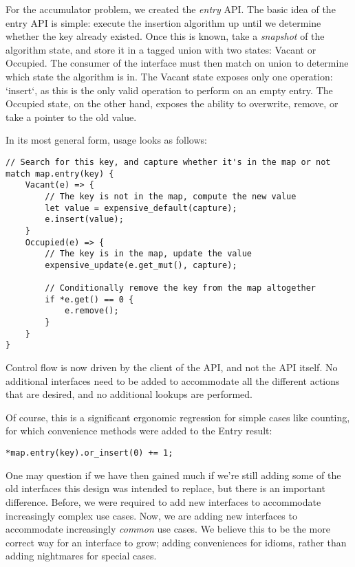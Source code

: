 For the accumulator problem, we created the \emph{entry} API. The basic idea of the
entry API is simple: execute the insertion algorithm up until we determine
whether the key already existed. Once this is known, take a \emph{snapshot} of
the algorithm state, and store it in a tagged union with two states: Vacant or
Occupied. The consumer of the interface must then match on union to determine
which state the algorithm is in. The Vacant state exposes only one operation:
`insert`, as this is the only valid operation to perform on an empty entry.
The Occupied state, on the other hand, exposes the ability to overwrite, remove,
or take a pointer to the old value.

In its most general form, usage looks as follows:

\begin{verbatim}
// Search for this key, and capture whether it's in the map or not
match map.entry(key) {
    Vacant(e) => {
        // The key is not in the map, compute the new value
        let value = expensive_default(capture);
        e.insert(value);
    }
    Occupied(e) => {
        // The key is in the map, update the value
        expensive_update(e.get_mut(), capture);

        // Conditionally remove the key from the map altogether
        if *e.get() == 0 {
            e.remove();
        }
    }
}
\end{verbatim}

Control flow is now driven by the client of the API, and not the API itself.
No additional interfaces need to be added to accommodate all the different
actions that are desired, and no additional lookups are performed.

Of course, this is a significant ergonomic regression for simple cases like
counting, for which convenience methods were added to the Entry result:

\begin{verbatim}
*map.entry(key).or_insert(0) += 1;
\end{verbatim}

One may question if we have then gained much if we're still adding some of
the old interfaces this design was intended to replace, but there is an important
difference. Before, we were required to add new interfaces to accommodate increasingly
complex use cases. Now, we are adding new interfaces to accommodate increasingly
\emph{common} use cases. We believe this to be the more correct way for an interface to
grow; adding conveniences for idioms, rather than adding nightmares for special cases.

